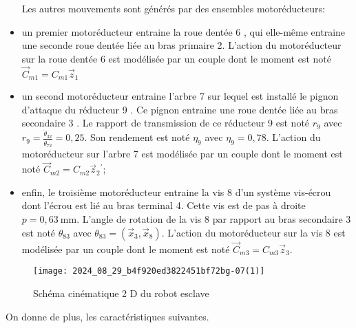 \begin{itemize}
Les autres mouvements sont générés par des ensembles motoréducteurs:
  \item un premier motoréducteur entraine la roue dentée 6 , qui elle-même entraine une seconde roue dentée liée au bras primaire 2. L'action du motoréducteur sur la roue dentée 6 est modélisée par un couple dont le moment est noté $\vec{C}_{m 1}=C_{m 1} \vec{z}_{1}$
  \item un second motoréducteur entraine l'arbre 7 sur lequel est installé le pignon d'attaque du réducteur 9 . Ce pignon entraine une roue dentée liée au bras secondaire 3 . Le rapport de transmission de ce réducteur 9 est noté $r_{9}$ avec $r_{9}=\frac{\dot{\theta}_{32}}{\dot{\theta}_{72}}=0,25$. Son rendement est noté $\eta_{9}$ avec $\eta_{9}=0,78$. L'action du motoréducteur sur l'arbre 7 est modélisée par un couple dont le moment est noté $\vec{C}_{m 2}=C_{m 2} \vec{z}_{2}{ }^{\prime}$;
  \item enfin, le troisième motoréducteur entraine la vis 8 d'un système vis-écrou dont l'écrou est lié au bras terminal 4. Cette vis est de pas à droite $p=0,63 \mathrm{~mm}$. L'angle de rotation de la vis 8 par rapport au bras secondaire 3 est noté $\theta_{83}$ avec $\theta_{83}=\left(\vec{x}_{3}, \vec{x}_{8}\right)$. L'action du motoréducteur sur la vis 8 est modélisée par un couple dont le moment est noté $\vec{C}_{m 3}=C_{m 3} \vec{z}_{3}$.
\end{itemize}


\begin{figure}[!h]
\centering
\texttt{[image: 2024\_08\_29\_b4f920ed3822451bf72bg-07(1)]}
\caption{\label{fig_07} Schéma cinématique 2 D du robot esclave}
\end{figure}

On donne de plus, les caractéristiques suivantes.

